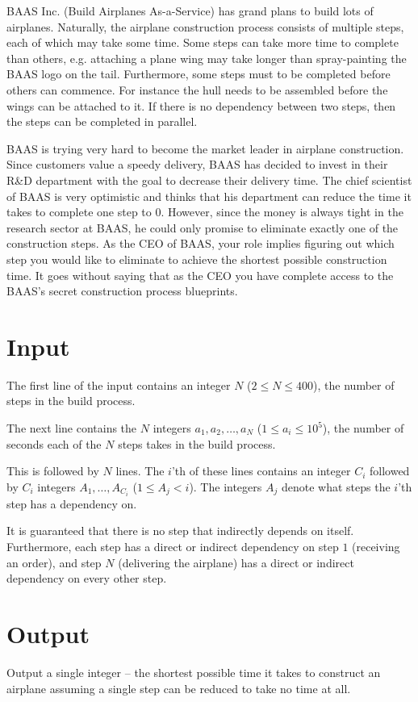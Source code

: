 BAAS Inc. (Build Airplanes As-a-Service) has grand plans to build lots of airplanes.
Naturally, the airplane construction process consists of multiple steps, each of which may take some time.
Some steps can take more time to complete than others, e.g. attaching a plane wing may take longer than spray-painting the BAAS logo on the tail.
Furthermore, some steps must to be completed before others can commence.
For instance the hull needs to be assembled before the wings can be attached to it.
If there is no dependency between two steps, then the steps can be completed in parallel.

BAAS is trying very hard to become the market leader in airplane construction.
Since customers value a speedy delivery, BAAS has decided to invest in their R\&D department with the goal to decrease their delivery time.
The chief scientist of BAAS is very optimistic and thinks that his department can reduce the time it takes to complete one step to $0$.
However, since the money is always tight in the research sector at BAAS, he could only promise to eliminate exactly one of the construction steps.
As the CEO of BAAS, your role implies figuring out which step you would like to eliminate to achieve the shortest possible construction time.
It goes without saying that as the CEO you have complete access to the BAAS's secret construction process blueprints.

\section*{Input}
The first line of the input contains an integer $N$ ($2 \le N \le 400$), the number of steps in the build process.

The next line contains the $N$ integers $a_1, a_2, \dots, a_N$ ($1 \le a_i \le 10^5$), the number of seconds each of the $N$ steps takes in the build process.

This is followed by $N$ lines.
The $i$'th of these lines contains an integer $C_i$ followed by $C_i$ integers $A_1, \dots, A_{C_i}$ ($1 \le A_j < i$).
The integers $A_j$ denote what steps the $i$'th step has a dependency on.

It is guaranteed that there is no step that indirectly depends on itself.
Furthermore, each step has a direct or indirect dependency on step $1$ (receiving an order), and step $N$ (delivering the airplane) has a direct or indirect dependency on every other step.

\section*{Output}
Output a single integer -- the shortest possible time it takes to construct an airplane assuming a single step can be reduced to take no time at all.
